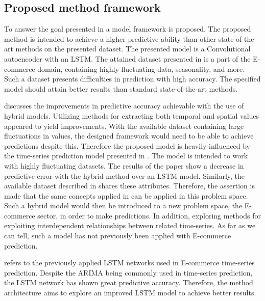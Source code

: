 \subsection{Proposed method framework}

To answer the goal presented in  a model framework is proposed.
The proposed method is intended to achieve a higher predictive ability than other state-of-the-art methods on the presented dataset.
The presented model is a Convolutional autoencoder with an LSTM.
The attained dataset presented in 
is a part of the E-commerce domain, containing highly fluctuating data, seasonality, and more.
Such a dataset presents difficulties in prediction with high accuracy. The specified model should attain better results than standard state-of-the-art methods.

 discusses the improvements in predictive accuracy achievable with the use of hybrid models.
Utilizing methods for extracting both temporal and spatial values appeared to yield improvements.
With the available dataset containing large fluctuations in values, the designed framework would need to be able to achieve predictions despite this.
Therefore the proposed model is heavily influenced by the time-series prediction model presented in \cite{Zhao2019}.
The model is intended to work with highly fluctuating datasets. The results of the paper show a decrease in predictive error with the hybrid method over an LSTM model.
Similarly, the available dataset described in
 shares these attributes.
Therefore, the assertion is made that the same concepts applied in \cite{Zhao2019} can be applied in this problem space.
Such a hybrid model would then be introduced to a new problem space, the E-commerce sector, in order to make predictions.
In addition, exploring methods for exploiting interdependent relationships between related time-series.
As far as we can tell, such a model has not previously been applied with E-commerce prediction.

refers to the previously applied LSTM networks used in E-commerce time-series prediction.
Despite the ARIMA being commonly used in time-series prediction, the LSTM network has shown great predictive accuracy.
Therefore, the method architecture aims to explore an improved LSTM model to achieve better results.

